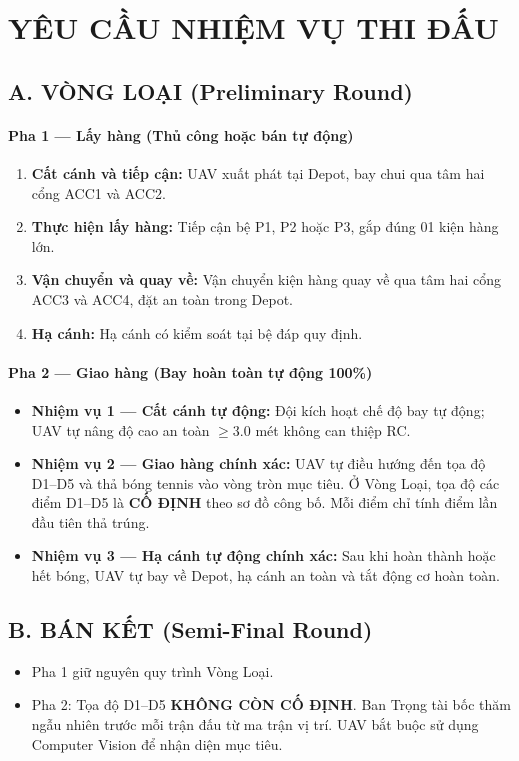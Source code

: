 \documentclass[12pt,a4paper]{article}
\begin{document}
\section{YÊU CẦU NHIỆM VỤ THI ĐẤU}

\subsection*{A. VÒNG LOẠI (Preliminary Round)}
\paragraph{Pha 1 — Lấy hàng (Thủ công hoặc bán tự động)}
\begin{enumerate}
\item \textbf{Cất cánh và tiếp cận:} UAV xuất phát tại Depot, bay chui qua tâm hai cổng ACC1 và ACC2.
\item \textbf{Thực hiện lấy hàng:} Tiếp cận bệ P1, P2 hoặc P3, gắp đúng 01 kiện hàng lớn.
\item \textbf{Vận chuyển và quay về:} Vận chuyển kiện hàng quay về qua tâm hai cổng ACC3 và ACC4, đặt an toàn trong Depot.
\item \textbf{Hạ cánh:} Hạ cánh có kiểm soát tại bệ đáp quy định.
\end{enumerate}

\paragraph{Pha 2 — Giao hàng (Bay hoàn toàn tự động 100\%)}
\begin{itemize}
\item \textbf{Nhiệm vụ 1 — Cất cánh tự động:} Đội kích hoạt chế độ bay tự động; UAV tự nâng độ cao an toàn $\geq 3.0$ mét không can thiệp RC.
\item \textbf{Nhiệm vụ 2 — Giao hàng chính xác:} UAV tự điều hướng đến tọa độ D1–D5 và thả bóng tennis vào vòng tròn mục tiêu. Ở Vòng Loại, tọa độ các điểm D1–D5 là \textbf{CỐ ĐỊNH} theo sơ đồ công bố. Mỗi điểm chỉ tính điểm lần đầu tiên thả trúng.
\item \textbf{Nhiệm vụ 3 — Hạ cánh tự động chính xác:} Sau khi hoàn thành hoặc hết bóng, UAV tự bay về Depot, hạ cánh an toàn và tắt động cơ hoàn toàn.
\end{itemize}

\subsection*{B. BÁN KẾT (Semi-Final Round)}
\begin{itemize}
\item Pha 1 giữ nguyên quy trình Vòng Loại.
\item Pha 2: Tọa độ D1–D5 \textbf{KHÔNG CÒN CỐ ĐỊNH}. Ban Trọng tài bốc thăm ngẫu nhiên trước mỗi trận đấu từ ma trận vị trí. UAV bắt buộc sử dụng Computer Vision để nhận diện mục tiêu.
\end{itemize}
\end{document}
